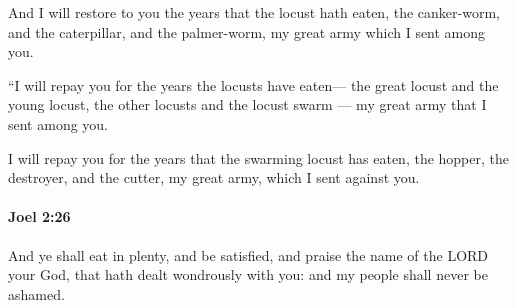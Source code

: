 			\begin{versebox}
					\item[BHS] 
					\item[LXX] 
					\item[ASV] And I will restore to you the years that the locust hath eaten, the canker-worm, and the caterpillar, and the palmer-worm, my great army which I sent among you.
					\item[NIV] “I will repay you for the years the locusts have eaten— the great locust and the young locust, the other locusts and the locust swarm — my great army that I sent among you.
					\item[NRSV] I will repay you for the years that the swarming locust has eaten, the hopper, the destroyer, and the cutter, my great army, which I sent against you.
			\end{versebox}

		\paragraph{Joel 2:26} %
			\label{JOEL-2-26}

			And ye shall eat in plenty, and be satisfied, and praise the name of the LORD your God, that hath dealt wondrously with you: and my people shall never be ashamed.

